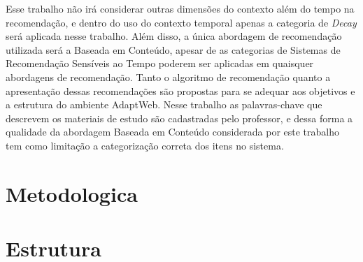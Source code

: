 Esse trabalho não irá considerar outras dimensões do contexto além do tempo na recomendação, e dentro do uso do contexto
temporal apenas a categoria de \textit{Decay} será aplicada nesse trabalho. Além disso, a única abordagem de recomendação
utilizada será a Baseada em Conteúdo, apesar de as categorias de Sistemas de Recomendação Sensíveis ao Tempo poderem ser
aplicadas em quaisquer abordagens de recomendação. Tanto o algoritmo de recomendação quanto a apresentação dessas
recomendações são propostas para se adequar aos objetivos e a estrutura do ambiente AdaptWeb\textsuperscript{\textregistered}.
Nesse trabalho as palavras-chave que descrevem os materiais de estudo são cadastradas pelo professor, e dessa forma a
qualidade da abordagem Baseada em Conteúdo considerada por este trabalho tem como limitação a categorização correta dos
itens no sistema.

\section{Metodologica}

\section{Estrutura}




